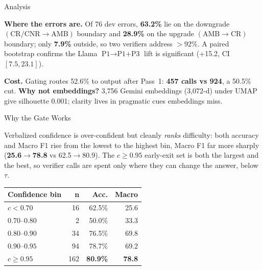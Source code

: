 \documentclass[final]{beamer}
\newlength{\halfW}\setlength{\halfW}{0.4625\paperwidth}
\begin{document}
\begin{frame}[t]
\begin{columns}[t]
\begin{column}{\halfW}
\begin{block}{Analysis}
\begin{minipage}[t]{0.44\linewidth}
    \end{minipage}
    \par\medskip
    \textbf{Where the errors are.} Of 76 dev errors, \textbf{63.2\%} lie on the downgrade
    $(\text{CR/CNR}\!\to\!\text{AMB})$ boundary and \textbf{28.9\%} on the upgrade
    $(\text{AMB}\!\to\!\text{CR})$ boundary; only \textbf{7.9\%} outside, so two verifiers address
    $>$92\%. A paired bootstrap confirms the Llama $\text{P1}\!\to\!\text{P1+P3}$ lift is
    significant (+15.2, CI $[7.5,23.1]$).
    \par\medskip
    \textbf{Cost.} Gating routes 52.6\% to output after Pass~1: \textbf{457 calls vs 924}, a
    50.5\% cut. \textbf{Why not embeddings?} 3{,}756 Gemini embeddings (3{,}072-d) under UMAP
    give silhouette 0.001; clarity lives in pragmatic cues embeddings miss.
  \end{block}
  \begin{block}{Why the Gate Works}
    \begin{minipage}[t]{0.52\linewidth}
      \vspace{0pt}
      Verbalized confidence is over-confident but cleanly \emph{ranks} difficulty: both accuracy
      and Macro F1 rise from the lowest to the highest bin, Macro F1 far more sharply
      (\textbf{25.6}$\to$\textbf{78.8} vs 62.5$\to$80.9). The $c\!\ge\!0.95$ early-exit set is
      both the largest and the best, so verifier calls are spent only where they can change the
      answer, below $\tau$.
    \end{minipage}\hfill
    \begin{minipage}[t]{0.45\linewidth}
      \vspace{0pt}\centering\fontsize{20}{23.5}\selectfont
      \begin{tabular}{@{}lrrr@{}}
        \toprule
        \textbf{Confidence bin} & \textbf{n} & \textbf{Acc.} & \textbf{Macro} \\
        \midrule
        $c<0.70$ & 16 & 62.5\% & 25.6 \\
        \color{slateA}$0.70\text{--}0.80$ & \color{slateA}2 & \color{slateA}50.0\% & \color{slateA}33.3 \\
        $0.80\text{--}0.90$ & 34 & 76.5\% & 69.8 \\
        $0.90\text{--}0.95$ & 94 & 78.7\% & 69.2 \\
        \rowcolor{lavender}$c\ge0.95$ & 162 & \textbf{80.9\%} & \textbf{78.8} \\
        \bottomrule
      \end{tabular}
    \end{minipage}

\end{block}
\end{column}
\end{columns}
\end{frame}
\end{document}

